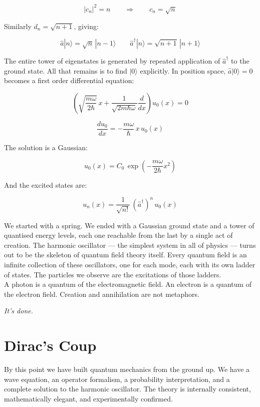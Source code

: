 \documentclass[krantz1,ChapterTOCs]{krantz}
\begin{document}
$$|c_n|^2 = n \qquad \Rightarrow \qquad c_n = \sqrt{n}$$

Similarly $d_n = \sqrt{n+1}$, giving:

$$\boxed{\hat{a}|n\rangle = \sqrt{n}\,|n-1\rangle} \qquad 
\boxed{\hat{a}^\dagger|n\rangle = \sqrt{n+1}\,|n+1\rangle}$$

The entire tower of eigenstates is generated by repeated 
application of $\hat{a}^\dagger$ to the ground state. All 
that remains is to find $|0\rangle$ explicitly. In position 
space, $\hat{a}|0\rangle = 0$ becomes a first order 
differential equation:

$$\left(\sqrt{\frac{m\omega}{2\hbar}}\,x 
+ \frac{1}{\sqrt{2m\hbar\omega}}\frac{d}{dx}\right)u_0(x) = 0$$

$$\frac{du_0}{dx} = -\frac{m\omega}{\hbar}\,x\,u_0(x)$$

The solution is a Gaussian:

$$\boxed{u_0(x) = C_0\,\exp\!\left(-\frac{m\omega}{2\hbar}x^2\right)}$$

And the excited states are:

$$\boxed{u_n(x) = \frac{1}{\sqrt{n!}}\,(\hat{a}^\dagger)^n\,u_0(x)}$$

We started with a spring. We ended with a Gaussian ground state 
and a tower of quantised energy levels, each one reachable from 
the last by a single act of creation. The harmonic oscillator 
--- the simplest system in all of physics --- turns out to be 
the skeleton of quantum field theory itself. Every quantum field 
is an infinite collection of these oscillators, one for each 
mode, each with its own ladder of states. The particles we 
observe are the excitations of those ladders.\\

A photon is a quantum of the electromagnetic field. An electron 
is a quantum of the electron field. Creation and annihilation 
are not metaphors.\\

\begin{center}
\textit{It's done.}
\end{center}

\part{Dirac's Coup}

By this point we have built quantum mechanics from the ground up. We
have a wave equation, an operator formalism, a probability
interpretation, and a complete solution to the harmonic oscillator.
The theory is internally consistent, mathematically elegant, and
experimentally confirmed.\\
\end{document}
